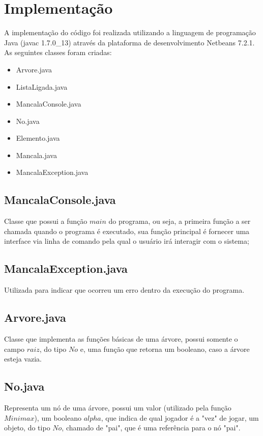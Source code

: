 \documentclass[a4paper,11pt]{article}
\begin{document}
\section{Implementação}
A implementação do código foi realizada utilizando a linguagem de programação Java (javac 1.7.0\_13) através da plataforma de desenvolvimento Netbeans 7.2.1.\\

As seguintes classes foram criadas:
\begin{itemize}
  \item Arvore.java   
  \item ListaLigada.java
  \item MancalaConsole.java
  \item No.java
  \item Elemento.java
  \item Mancala.java
  \item MancalaException.java
\end{itemize}

\subsection{MancalaConsole.java}
Classe que possui a função $main$ do programa, ou seja, a primeira função a ser chamada quando o programa é executado, sua função principal é fornecer uma interface via linha de comando pela qual o usuário irá interagir com o sistema;

\subsection{MancalaException.java}
Utilizada para indicar que ocorreu um erro dentro da execução do programa.

\subsection{Arvore.java}
Classe que implementa as funções básicas de uma árvore, possui somente o campo $raiz$, do tipo $No$ e, uma função que retorna um booleano, caso a árvore esteja vazia.

\subsection{No.java}
Representa um nó de uma árvore, possui um valor (utilizado pela função $Minimax$), um booleano $alpha$, que indica de qual jogador é a "vez" de jogar, um objeto, do tipo $No$, chamado de "pai", que é uma referência para o nó "pai". 
\end{document}

